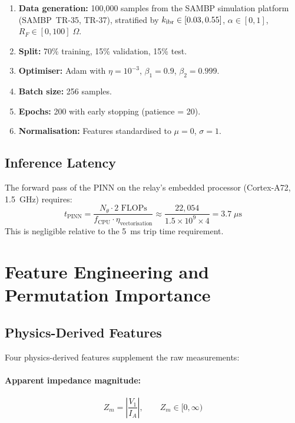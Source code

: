 \begin{enumerate}
\item \textbf{Data generation:} 100{,}000 samples from the SAMBP
      simulation platform (SAMBP~TR-35, TR-37), stratified by
      $k_{\mathrm{ibr}} \in [0.03, 0.55]$, $\alpha \in [0, 1]$, $R_F \in [0, 100]\;\Omega$.
\item \textbf{Split:} 70\% training, 15\% validation, 15\% test.
\item \textbf{Optimiser:} Adam with $\eta = 10^{-3}$, $\beta_1 = 0.9$,
      $\beta_2 = 0.999$.
\item \textbf{Batch size:} 256 samples.
\item \textbf{Epochs:} 200 with early stopping (patience = 20).
\item \textbf{Normalisation:} Features standardised to $\mu = 0$, $\sigma = 1$.
\end{enumerate}

\subsection{Inference Latency}

The forward pass of the PINN on the relay's embedded processor
(Cortex-A72, 1.5~GHz) requires:
\begin{equation}
  t_\mathrm{PINN} = \frac{N_\theta \cdot 2 \text{ FLOPs}}
    {f_\mathrm{CPU} \cdot \eta_\mathrm{vectorisation}}
  \approx \frac{22{,}054}{1.5 \times 10^9 \times 4} = 3.7\;\mu\mathrm{s}
  \label{eq:ch8_latency}
\end{equation}
This is negligible relative to the 5~ms trip time requirement.

\section{Feature Engineering and Permutation Importance}
\label{sec:ch8_features}

\subsection{Physics-Derived Features}

Four physics-derived features supplement the raw measurements:

\paragraph{Apparent impedance magnitude:}
\begin{equation}
  Z_m = \left|\frac{V_1}{I_A}\right|, \qquad Z_m \in [0, \infty)
  \label{eq:ch8_zm}
\end{equation}

